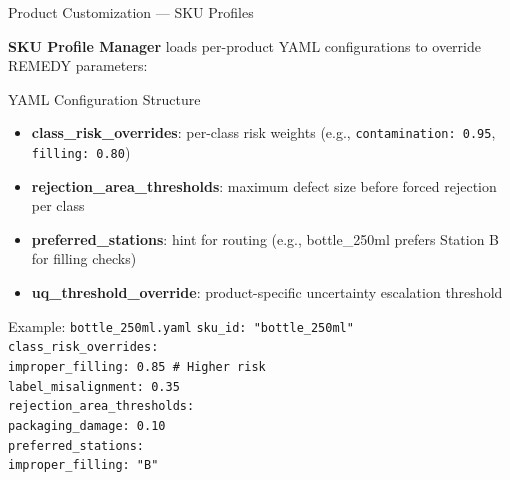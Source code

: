\documentclass[10pt]{beamer}
\begin{document}
\begin{frame}{Product Customization --- SKU Profiles}

\small
\textbf{SKU Profile Manager} loads per-product YAML configurations to override REMEDY parameters:

\vspace{8pt}
\begin{block}{YAML Configuration Structure}
\begin{itemize}\setlength{\itemsep}{5pt}
    \item \textbf{class\_risk\_overrides}: per-class risk weights (e.g., \texttt{contamination: 0.95}, \texttt{filling: 0.80})
    \item \textbf{rejection\_area\_thresholds}: maximum defect size before forced rejection per class
    \item \textbf{preferred\_stations}: hint for routing (e.g., bottle\_250ml prefers Station B for filling checks)
    \item \textbf{uq\_threshold\_override}: product-specific uncertainty escalation threshold
\end{itemize}
\end{block}

\vspace{8pt}
\begin{block}{Example: \texttt{bottle\_250ml.yaml}}
\tiny
\texttt{sku\_id: "bottle\_250ml"} \\
\texttt{class\_risk\_overrides:} \\
\texttt{\hspace*{0.2cm}improper\_filling: 0.85  \# Higher risk} \\
\texttt{\hspace*{0.2cm}label\_misalignment: 0.35} \\
\texttt{rejection\_area\_thresholds:} \\
\texttt{\hspace*{0.2cm}packaging\_damage: 0.10} \\
\texttt{preferred\_stations:} \\
\texttt{\hspace*{0.2cm}improper\_filling: "B"}
\end{block}

\end{frame}


\end{document}
